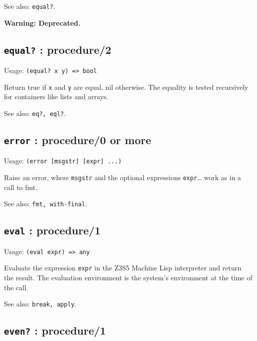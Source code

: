 \documentclass[
]{article}
\newcommand{\passthrough}[1]{#1}
\begin{document}
See also: \passthrough{\lstinline!equal?!}.

\textbf{Warning: Deprecated.}

\hypertarget{equal-procedure2-1}{%
\subsection{\texorpdfstring{\texttt{equal?} :
procedure/2}{equal? : procedure/2}}\label{equal-procedure2-1}}

Usage: \passthrough{\lstinline!(equal? x y) => bool!}

Return true if \passthrough{\lstinline!x!} and
\passthrough{\lstinline!y!} are equal, nil otherwise. The equality is
tested recursively for containers like lists and arrays.

See also: \passthrough{\lstinline!eq?, eql?!}.

\hypertarget{error-procedure0-or-more-1}{%
\subsection{\texorpdfstring{\texttt{error} : procedure/0 or
more}{error : procedure/0 or more}}\label{error-procedure0-or-more-1}}

Usage: \passthrough{\lstinline!(error [msgstr] [expr] ...)!}

Raise an error, where \passthrough{\lstinline!msgstr!} and the optional
expressions \passthrough{\lstinline!expr!}\ldots{} work as in a call to
fmt.

See also: \passthrough{\lstinline!fmt, with-final!}.

\hypertarget{eval-procedure1-1}{%
\subsection{\texorpdfstring{\texttt{eval} :
procedure/1}{eval : procedure/1}}\label{eval-procedure1-1}}

Usage: \passthrough{\lstinline!(eval expr) => any!}

Evaluate the expression \passthrough{\lstinline!expr!} in the Z3S5
Machine Lisp interpreter and return the result. The evaluation
environment is the system's environment at the time of the call.

See also: \passthrough{\lstinline!break, apply!}.

\hypertarget{even-procedure1-1}{%
\subsection{\texorpdfstring{\texttt{even?} :
procedure/1}{even? : procedure/1}}\label{even-procedure1-1}}
\end{document}
